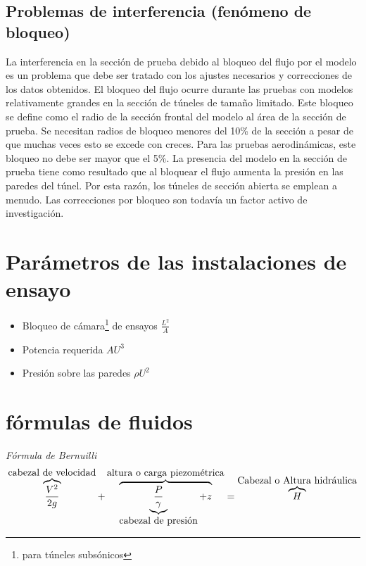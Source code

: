 \documentclass[10pt,a4paper]{article}
\begin{document}
\subsection{Problemas de interferencia (fenómeno de bloqueo)}
La interferencia en la sección de prueba debido al bloqueo del flujo por el modelo es un problema que debe ser tratado con los ajustes necesarios y correcciones de los datos obtenidos. El bloqueo del flujo ocurre durante las pruebas con modelos relativamente grandes en la sección de túneles de tamaño limitado. Este bloqueo se define como el radio de la sección frontal del modelo al área de la sección de prueba. Se necesitan radios de bloqueo menores del 10\% de la sección a pesar de que muchas veces esto se excede con creces. Para las pruebas aerodinámicas, este bloqueo no debe ser mayor que el 5\%. La presencia del modelo en la sección de prueba tiene como resultado que al bloquear el flujo aumenta la presión en las paredes del túnel. Por esta razón, los túneles de sección abierta se emplean a menudo. Las correcciones por bloqueo son todavía un factor activo de investigación.
\section{Parámetros de las instalaciones de ensayo}

\begin{itemize}
\item
 Bloqueo de cámara\footnote{para túneles subsónicos}  de ensayos $\frac{L^{2}}{A}$
\item
Potencia requerida $AU^{3}$
\item
Presión sobre las paredes $\rho U^{2}$
\end{itemize}
\section{fórmulas de fluidos}
\textit{Fórmula de Bernuilli}
\begin{equation}
\label{bernu}
\overbrace{{V^2 \over 2 g}}^{\mbox{cabezal de velocidad}}+\overbrace{\underbrace{\frac{P}{\gamma}}_{\mbox{cabezal de presión}} + z}^{\mbox{altura o carga piezométrica}} = \overbrace{H}^{\mbox{Cabezal o Altura hidráulica}}
\end{equation}
\vspace{2cm}
\end{document}
